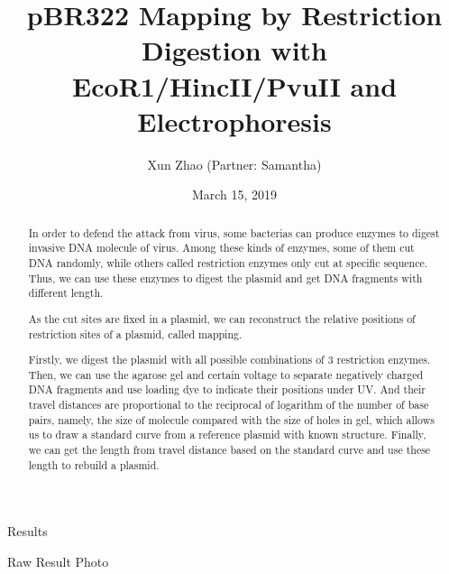 \documentclass{article}
\title{\bf{pBR322 Mapping by Restriction Digestion with EcoR1/HincII/PvuII and Electrophoresis}}
\author{Xun Zhao (Partner: Samantha)}
\date{March 15, 2019}
\begin{document}
    \begin{titlepage}
        \maketitle
        \setcounter{page}{0}
        \thispagestyle{empty}
    \end{titlepage}

    \renewcommand{\abstractname}{Introduction}
    \begin{abstract}
        In order to defend the attack from virus, some bacterias can produce enzymes to digest invasive DNA molecule of virus. Among these kinds of enzymes, some of them cut DNA randomly, while others called restriction enzymes only cut at specific sequence. Thus, we can use these enzymes to digest the plasmid and get DNA fragments with different length. 

        As the cut sites are fixed in a plasmid, we can reconstruct the relative positions of restriction sites of a plasmid, called mapping.

        Firstly, we digest the plasmid with all possible combinations of 3 restriction enzymes. Then, we can use the agarose gel and certain voltage to separate negatively charged DNA fragments and use loading dye to indicate their positions under UV. And their travel distances are proportional to the reciprocal of logarithm of the number of base pairs, namely, the size of molecule compared with the size of holes in gel, which allows us to draw a standard curve from a reference plasmid with known structure. Finally, we can get the length from travel distance based on the standard curve and use these length to rebuild a plasmid.
    \end{abstract}

    \begin{section}{Results}
        \begin{subsection}{Raw Result Photo}
        \end{subsection}
    \end{section}
\end{document}
